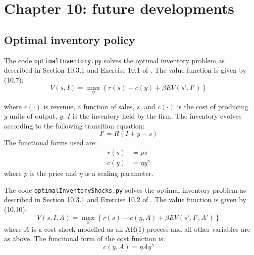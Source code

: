 \section{Chapter 10: future developments}

\subsection{Optimal inventory policy}

The code \texttt{optimalInventory.py} solves the optimal inventory problem as described in Section 10.3.1 and Exercise 10.1 of \citet{adda2003dynamic}. The value function is given by (10.7):
%
\begin{equation}
	V(s, I) = \max_{y} \left\{ r(s) - c(y) + \beta EV(s', I') \right\}
\end{equation}
%

where \(r(\cdot)\) is revenue, a function of sales, \(s\), and \(c(\cdot)\) is the cost of producing \(y\) units of output, \(y\). \(I\) is the inventory held by the firm. The inventory evolves according to the following transition equation:
%
\begin{equation}
	I' = R(I + y - s)
\end{equation}
%
The functional forms used are:
%
\begin{align}
 r(s) &=  ps \\
 c(y) &= \eta y^{\gamma}
\end{align}
%
where \(p\) is the price and \(\eta\) is a scaling parameter.

The code \texttt{optimalInventoryShocks.py} solves the optimal inventory problem as described in Section 10.3.1 and Exercise 10.2 of \citet{adda2003dynamic}. The value function is given by (10.10):
%
\begin{equation}
	V(s, I, A) = \max_{y} \left\{ r(s) - c(y, A) + \beta EV(s', I', A') \right\}
\end{equation}
%
where \(A\) is a cost shock modelled as an AR(1) process and all other variables are as above. The functional form of the cost function is:
%
\begin{equation}
 c(y, A) = \eta A y^{\gamma}
\end{equation}
%
